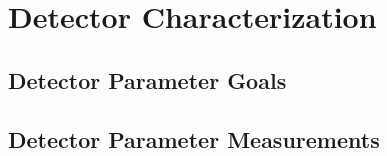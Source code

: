 \chapter{Detector Characterization}
\label{charecterization_chapter}




\section{Detector Parameter Goals}
\label{parameter_goals_section}



\section{Detector Parameter Measurements}
\label{parameter_measurements_section}




